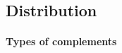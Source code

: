 \documentclass[a4,12pt]{scrartcl}
\begin{document}
\begin{exe}
\ex %


\ex %

\ex %


\end{exe}



\subsection{Distribution}
\paragraph{Types of complements}%
\end{document}
